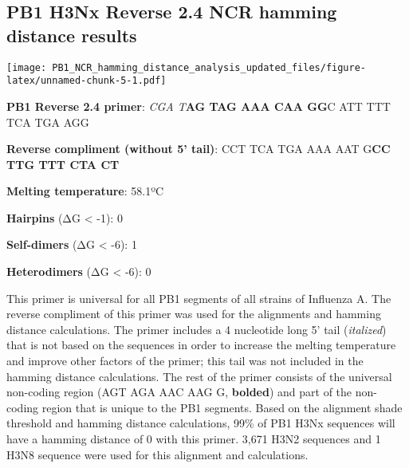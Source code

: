 \documentclass[
]{article}
\newenvironment{Shaded}{\begin{snugshade}}{\end{snugshade}}
\newcommand{\AttributeTok}[1]{\textcolor[rgb]{0.77,0.63,0.00}{#1}}
\newcommand{\DecValTok}[1]{\textcolor[rgb]{0.00,0.00,0.81}{#1}}
\newcommand{\FunctionTok}[1]{\textcolor[rgb]{0.00,0.00,0.00}{#1}}
\newcommand{\NormalTok}[1]{#1}
\newcommand{\OtherTok}[1]{\textcolor[rgb]{0.56,0.35,0.01}{#1}}
\newcommand{\SpecialCharTok}[1]{\textcolor[rgb]{0.00,0.00,0.00}{#1}}
\newcommand{\StringTok}[1]{\textcolor[rgb]{0.31,0.60,0.02}{#1}}
\begin{document}
\hypertarget{pb1-h3nx-reverse-2.4-ncr-hamming-distance-results}{%
\subsection{PB1 H3Nx Reverse 2.4 NCR hamming distance
results}\label{pb1-h3nx-reverse-2.4-ncr-hamming-distance-results}}

\begin{Shaded}
\end{Shaded}

\texttt{[image: PB1\_NCR\_hamming\_distance\_analysis\_updated\_files/figure-latex/unnamed-chunk-5-1.pdf]}

\textbf{PB1 Reverse 2.4 primer}: \emph{CGA T}\textbf{AG TAG AAA CAA GG}C
ATT TTT TCA TGA AGG

\textbf{Reverse compliment (without 5' tail)}: CCT TCA TGA AAA AAT
G\textbf{CC TTG TTT CTA CT}

\textbf{Melting temperature}: 58.1ºC

\textbf{Hairpins} (ΔG \textless{} -1): 0

\textbf{Self-dimers} (ΔG \textless{} -6): 1

\textbf{Heterodimers} (ΔG \textless{} -6): 0

This primer is universal for all PB1 segments of all strains of
Influenza A. The reverse compliment of this primer was used for the
alignments and hamming distance calculations. The primer includes a 4
nucleotide long 5' tail (\emph{italized}) that is not based on the
sequences in order to increase the melting temperature and improve other
factors of the primer; this tail was not included in the hamming
distance calculations. The rest of the primer consists of the universal
non-coding region (AGT AGA AAC AAG G, \textbf{bolded}) and part of the
non-coding region that is unique to the PB1 segments. Based on the
alignment shade threshold and hamming distance calculations, 99\% of PB1
H3Nx sequences will have a hamming distance of 0 with this primer. 3,671
H3N2 sequences and 1 H3N8 sequence were used for this alignment and
calculations.
\end{document}
